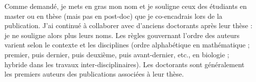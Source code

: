 
Comme demandé, je mets en gras mon nom et je souligne ceux des étudiants en master ou en thèse (mais pas en post-doc) que je co-encadrais lors de la publication. 
J'ai continué à collaborer avec d'anciens doctorants après leur thèse : je ne souligne alors plus leurs noms.
Les règles gouvernant l'ordre des auteurs varient selon le contexte et les disciplines (ordre alphabétique en mathématique ; premier, puis dernier, puis deuxième, puis avant-dernier, etc., en biologie ; hybride dans les travaux inter-disciplinaires). 
Les doctorants sont généralement les premiers auteurs des publications associées à leur thèse.







